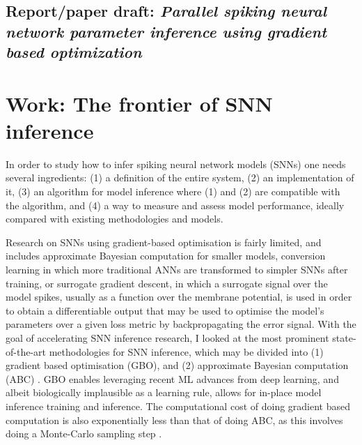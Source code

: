 \documentclass[mphil,deptreport,ianc]{infthesis} %
\begin{document}
\section{Report/paper draft: \textit{Parallel spiking neural network parameter inference using gradient based optimization}}



\chapter{Work: The frontier of SNN inference}

In order to study how to infer spiking neural network models (SNNs) one needs several ingredients: (1) a definition of the entire system, (2) an implementation of it, (3) an algorithm for model inference where (1) and (2) are compatible with the algorithm, and (4) a way to measure and assess model performance, ideally compared with existing methodologies and models.

Research on SNNs using gradient-based optimisation is fairly limited, and includes approximate Bayesian computation for smaller models, conversion learning in which more traditional ANNs are transformed to simpler SNNs after training, or surrogate gradient descent, in which a surrogate signal over the model spikes, usually as a function over the membrane potential, is used in order to obtain a differentiable output that may be used to optimise the model's parameters over a given loss metric by backpropagating the error signal.
With the goal of accelerating SNN inference research, I looked at the most prominent state-of-the-art methodologies for SNN inference, which may be divided into (1) gradient based optimisation (GBO), and (2) approximate Bayesian computation (ABC) \cite{Lueckmann2018, Rene2020, Cranmer2020a, Lueckmann2021}.
GBO enables leveraging recent ML advances from deep learning, and albeit biologically implausible as a learning rule, allows for in-place model inference training and inference. The computational cost of doing gradient based computation is also exponentially less than that of doing ABC, as this involves doing a Monte-Carlo sampling step \cite{Rene2020}.
\end{document}
